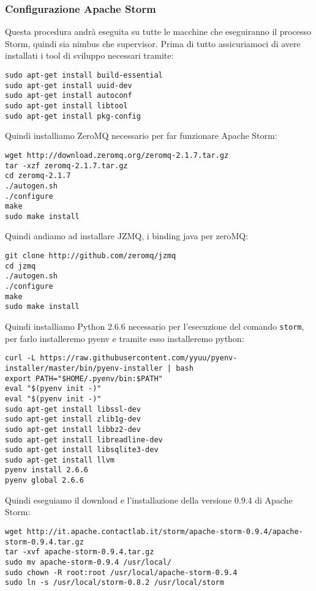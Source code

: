 \documentclass[12pt]{article}
\begin{document}
\subsubsection{Configurazione Apache Storm}
Questa procedura andr\`a eseguita su tutte le macchine che eseguiranno il processo Storm, quindi sia nimbus che supervisor.
Prima di tutto assicuriamoci di avere installati i tool di sviluppo necessari tramite:
\begin{lstlisting}
sudo apt-get install build-essential
sudo apt-get install uuid-dev
sudo apt-get install autoconf
sudo apt-get install libtool
sudo apt-get install pkg-config
\end{lstlisting}
Quindi installiamo ZeroMQ necessario per far funzionare Apache Storm:
\begin{lstlisting}
wget http://download.zeromq.org/zeromq-2.1.7.tar.gz
tar -xzf zeromq-2.1.7.tar.gz
cd zeromq-2.1.7
./autogen.sh
./configure
make
sudo make install
\end{lstlisting}
Quindi andiamo ad installare JZMQ, i binding java per zeroMQ:
\begin{lstlisting}
git clone http://github.com/zeromq/jzmq
cd jzmq
./autogen.sh
./configure
make
sudo make install
\end{lstlisting}
Quindi installiamo Python 2.6.6 necessario per l'esecuzione del comando \texttt{storm}, per farlo installeremo pyenv e tramite esso installeremo python:
\begin{lstlisting}
curl -L https://raw.githubusercontent.com/yyuu/pyenv-installer/master/bin/pyenv-installer | bash
export PATH="$HOME/.pyenv/bin:$PATH"
eval "$(pyenv init -)"
eval "$(pyenv init -)"
sudo apt-get install libssl-dev 
sudo apt-get install zlib1g-dev 
sudo apt-get install libbz2-dev
sudo apt-get install libreadline-dev 
sudo apt-get install libsqlite3-dev
sudo apt-get install llvm
pyenv install 2.6.6
pyenv global 2.6.6
\end{lstlisting}
Quindi eseguiamo il download e l'installazione della versione 0.9.4 di Apache Storm:
\begin{lstlisting}
wget http://it.apache.contactlab.it/storm/apache-storm-0.9.4/apache-storm-0.9.4.tar.gz
tar -xvf apache-storm-0.9.4.tar.gz
sudo mv apache-storm-0.9.4 /usr/local/
sudo chown -R root:root /usr/local/apache-storm-0.9.4
sudo ln -s /usr/local/storm-0.8.2 /usr/local/storm
\end{lstlisting}
\end{document}
